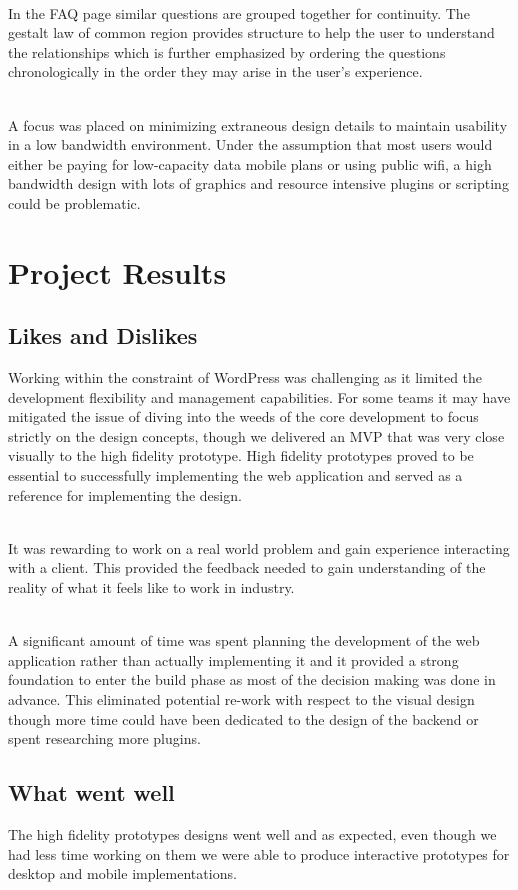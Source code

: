\documentclass[english,course]{lecture}
\begin{document}
\\In the FAQ page similar questions are grouped together for continuity. The gestalt law of common region provides structure to help the user to understand the relationships which is further emphasized by ordering the questions chronologically in the order they may arise in the user's experience.

\\A focus was placed on minimizing extraneous design details to maintain usability in a low bandwidth environment. Under the assumption that most users would either be paying for low-capacity data mobile plans or using public wifi, a high bandwidth design with lots of graphics and resource intensive plugins or scripting could be problematic.

\section{Project Results}
\subsection{Likes and Dislikes}
Working within the constraint of WordPress was challenging as it limited the development flexibility and management capabilities. For some teams it may have mitigated the issue of diving into the weeds of the core development to focus strictly on the design concepts, though we delivered an MVP that was very close visually to the high fidelity prototype. High fidelity prototypes proved to be essential to successfully implementing the web application and served as a reference for implementing the design.

\\It was rewarding to work on a real world problem and gain experience interacting with a client. This provided the feedback needed to gain understanding of the reality of what it feels like to work in industry.

\\A significant amount of time was spent planning the development of the web application rather than actually implementing it and it provided a strong foundation to enter the build phase as most of the decision making was done in advance. This eliminated potential re-work with respect to the visual design though more time could have been dedicated to the design of the backend or spent researching more plugins.

\subsection{What went well}
The high fidelity prototypes designs went well and as expected, even though we had less time working on them we were able to produce interactive prototypes for desktop and mobile implementations.
\end{document}
